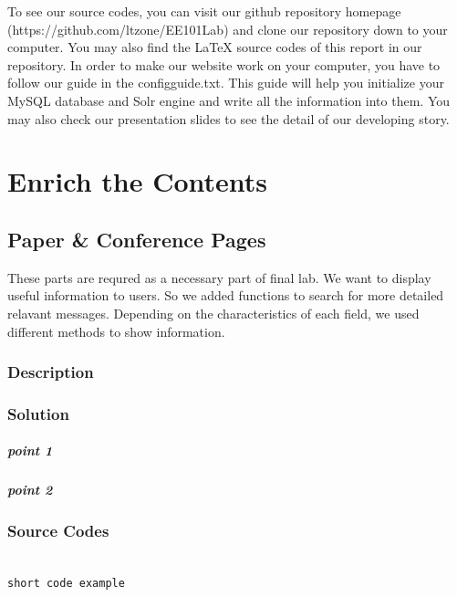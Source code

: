 \documentclass{book}
\begin{document}
To see our source codes, you can visit our github repository homepage (https://github.com/ltzone/EE101Lab) and clone our repository down to your computer. You may also find the LaTeX source codes of this report in our repository. In order to make our website work on your computer, you have to follow our guide in the configguide.txt. This guide will help you initialize your MySQL database and Solr engine and write all the information into them. You may also check our presentation slides to see the detail of our developing story.



\mainmatter
\chapter {Enrich the Contents}

\section {Paper \& Conference Pages}

These parts are requred as a necessary part of final lab. We want to display useful information to users. So we added functions to search for more detailed relavant messages.
Depending on the characteristics of each field, we used different methods to show information.


\subsection{Description}

\subsection{Solution}

\paragraph{point 1}

\paragraph{point 2}

\subsection{Source Codes}

\begin{minipage}[r]{15em}
\begin{verbatim}

short code example

\end{verbatim}
\end{minipage}
\end{document}

